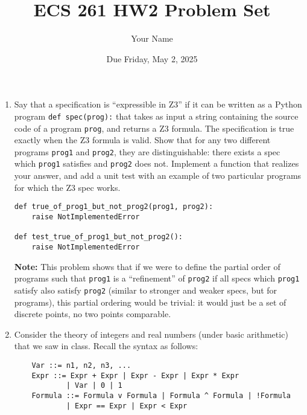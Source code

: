 \documentclass{article}
\begin{document}
\title{ECS 261 HW2 Problem Set}
\author{Your Name}
\date{Due Friday, May 2, 2025}

\maketitle

\begin{enumerate}
\item
Say that a specification is ``expressible in Z3'' if it can be written as a Python program \texttt{def spec(prog):} that takes as input a string containing the source code of a program \texttt{prog}, and returns a Z3 formula.
The specification is true exactly when the Z3 formula is valid.
Show that for any two different programs \texttt{prog1} and \texttt{prog2},
they are distinguishable: there exists a spec which \texttt{prog1} satisfies and \texttt{prog2} does not.
Implement a function that realizes your answer, and add a unit test with an example of two particular programs for which the Z3 spec works.
\begin{verbatim}
def true_of_prog1_but_not_prog2(prog1, prog2):
    raise NotImplementedError

def test_true_of_prog1_but_not_prog2():
    raise NotImplementedError
\end{verbatim}

\textbf{Note:}
This problem shows that if we were to define the partial order of programs such that \texttt{prog1}
is a ``refinement'' of \texttt{prog2} if all specs which \texttt{prog1} satisfy also satisfy \texttt{prog2} (similar to stronger and weaker specs, but for programs), this partial ordering would be trivial: it would just be a set of discrete points, no two points comparable.

\item
Consider the theory of integers and real numbers (under basic arithmetic) that we saw in class.
Recall the syntax as follows:
\begin{verbatim}
    Var ::= n1, n2, n3, ...
    Expr ::= Expr + Expr | Expr - Expr | Expr * Expr
            | Var | 0 | 1
    Formula ::= Formula v Formula | Formula ^ Formula | !Formula
            | Expr == Expr | Expr < Expr
\end{verbatim}


\end{enumerate}
\end{document}
